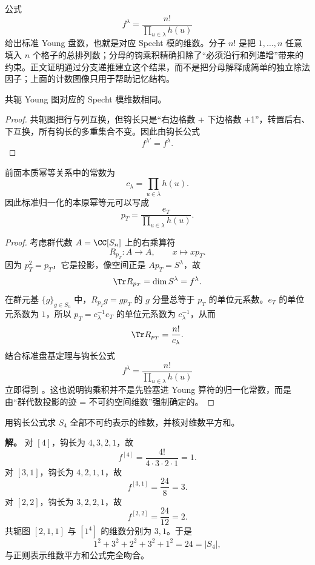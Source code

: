 公式
\[
f^\lambda=\frac{n!}{\prod_{u\in\lambda}h(u)}
\]
给出标准 Young 盘数，也就是对应 Specht 模的维数。分子 $n!$ 是把 $1,\dots,n$ 任意填入 $n$ 个格子的总排列数；分母的钩乘积精确扣除了“必须沿行和列递增”带来的约束。正文证明通过分支递推建立这个结果，而不是把分母解释成简单的独立除法因子；上面的计数图像只用于帮助记忆结构。

\begin{proposition}
共轭 Young 图对应的 Specht 模维数相同。
\end{proposition}

\begin{proof}
共轭图把行与列互换，但钩长只是“右边格数 + 下边格数 +1”，转置后右、下互换，所有钩长的多重集合不变。因此由钩长公式
\[
f^{\lambda'}=f^\lambda.
\]
\end{proof}


\begin{corollary}
前面本质幂等关系中的常数为
\begin{equation}
c_\lambda=\prod_{u\in\lambda}h(u).
\label{eq:hook-product}
\end{equation}
因此标准归一化的本原幂等元可以写成
\[
p_T=\frac{e_T}{\displaystyle\prod_{u\in\lambda}h(u)}.
\]

\end{corollary}

\begin{proof}
考虑群代数 $A=\CC[S_n]$ 上的右乘算符
\[
R_{p_T}:A\to A,
\qquad x\longmapsto xp_T.
\]
因为 $p_T^2=p_T$，它是投影，像空间正是 $Ap_T=S^\lambda$，故
\[
\Tr R_{p_T}=\dim S^\lambda=f^\lambda.
\]
在群元基 $\{g\}_{g\in S_n}$ 中，$R_{p_T}g=gp_T$ 的 $g$ 分量总等于 $p_T$ 的单位元系数。$e_T$ 的单位元系数为 $1$，所以 $p_T=c_\lambda^{-1}e_T$ 的单位元系数为 $c_\lambda^{-1}$，从而
\[
\Tr R_{p_T}=\frac{n!}{c_\lambda}.
\]
结合标准盘基定理与钩长公式
\[
f^\lambda=\frac{n!}{\prod_{u\in\lambda}h(u)}
\]
立即得到 。这也说明钩乘积并不是先验塞进 Young 算符的归一化常数，而是由“群代数投影的迹 = 不可约空间维数”强制确定的。
\end{proof}

\begin{example}[{$S_4$ 的不可约表示维数}]
用钩长公式求 $S_4$ 全部不可约表示的维数，并核对维数平方和。

\textbf{解。} 对 $[4]$，钩长为 $4,3,2,1$，故
\[
f^{[4]}=\frac{4!}{4\cdot3\cdot2\cdot1}=1.
\]
对 $[3,1]$，钩长为 $4,2,1,1$，故
\[
f^{[3,1]}=\frac{24}{8}=3.
\]
对 $[2,2]$，钩长为 $3,2,2,1$，故
\[
f^{[2,2]}=\frac{24}{12}=2.
\]
共轭图 $[2,1,1]$ 与 $[1^4]$ 的维数分别为 $3,1$。于是
\[
1^2+3^2+2^2+3^2+1^2=24=|S_4|,
\]
与正则表示维数平方和公式完全吻合。
\end{example}

